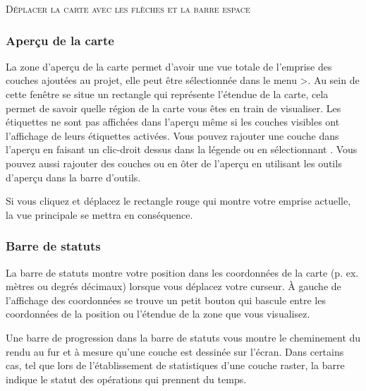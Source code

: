 \begin{Astuce}\caption{\textsc{Déplacer la carte avec les flèches et la barre espace}}
\end{Astuce}

\subsubsection{Aperçu de la carte}\label{label_mapoverview}

La zone d'aperçu de la carte permet d'avoir une vue totale de l'emprise des couches ajoutées au projet, elle peut être sélectionnée dans le menu >. Au sein de cette fenêtre se situe un rectangle qui représente l'étendue de la carte, cela permet de savoir quelle région de la carte vous êtes en train de visualiser. Les étiquettes ne sont pas affichées dans l'aperçu même si les couches visibles ont l'affichage de leurs étiquettes activées.
Vous pouvez rajouter une couche dans l'aperçu en faisant un clic-droit dessus dans la légende ou en sélectionnant . Vous pouvez aussi rajouter des couches ou en ôter de l'aperçu en utilisant les outils d'aperçu dans la barre d'outils.

Si vous cliquez et déplacez le rectangle rouge qui montre votre emprise actuelle, la vue principale se mettra en conséquence.

\subsubsection{Barre de statuts}\label{label_statusbar}

La barre de statuts montre votre position dans les coordonnées de la carte (p. ex. mètres ou degrés décimaux) lorsque vous déplacez votre curseur. À gauche de l'affichage des coordonnées se trouve un petit bouton qui bascule entre les coordonnées de la position ou l'étendue de la zone que vous visualisez.

Une barre de progression dans la barre de statuts vous montre le cheminement du rendu au fur et à mesure qu'une couche est dessinée sur l'écran. Dans certains cas, tel que lors de l'établissement de statistiques d'une couche raster, la barre indique le statut des opérations qui prennent du temps.

